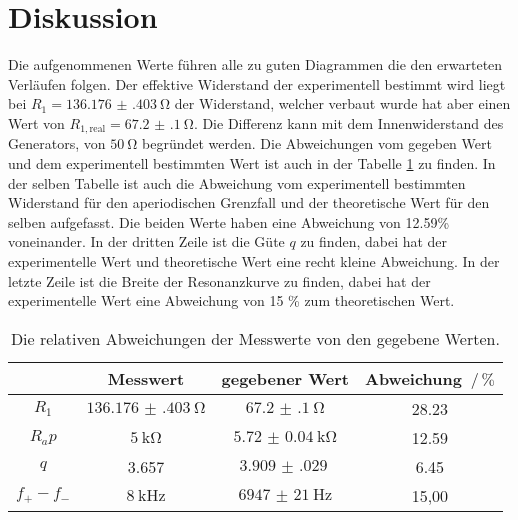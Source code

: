 \section{Diskussion}
\label{sec:Diskussion}

Die aufgenommenen Werte führen alle zu guten Diagrammen die den erwarteten Verläufen folgen.
Der effektive Widerstand der experimentell bestimmt wird liegt bei $R_1 = \SI{136.176(403)}{\ohm}$ der Widerstand, welcher verbaut wurde hat aber einen Wert von $R_{1,\text{real}}=\SI{67.2(1)}{\ohm}$.
Die Differenz kann mit dem Innenwiderstand des Generators, von $\SI{50}{\ohm}$ begründet werden.
Die Abweichungen vom gegeben Wert und dem experimentell bestimmten Wert ist auch in der Tabelle \ref{tab:fehler} zu finden.
In der selben Tabelle ist auch die Abweichung vom experimentell bestimmten Widerstand für den aperiodischen Grenzfall und der theoretische Wert für den selben aufgefasst.
Die beiden Werte haben eine Abweichung von 12.59\% voneinander.
In der dritten Zeile ist die Güte $q$ zu finden, dabei hat der experimentelle Wert und theoretische Wert eine recht kleine Abweichung.
In der letzte Zeile ist die Breite der Resonanzkurve zu finden, dabei hat der experimentelle Wert eine Abweichung von 15 \% zum theoretischen Wert.

\begin{table}
\centering
\caption{Die relativen Abweichungen der Messwerte von den gegebene Werten.}
\begin{tabular}{cccc}
\toprule
 & Messwert & gegebener Wert & Abweichung $ \,/\, \%$ \\
\midrule
$R_1$ &  $\SI{136.176(403)}{\ohm}$ & $\SI{67.2(1)}{\ohm}$ & 28.23 \\
$R_ap$ & $\SI{5}{\kilo\ohm}$ & $\SI{5.72(4)}{\kilo\ohm}$ & 12.59 \\
$q$ & 3.657 & $\SI{3.909(029)}{}$ & 6.45 \\
$f_{+}- f_{-}$ & $\SI{8}{\kilo\hertz}$ & $\SI{6947(21)}{\hertz}$ & 15,00 \\
\bottomrule
\end{tabular}
\label{tab:fehler}
\end{table}